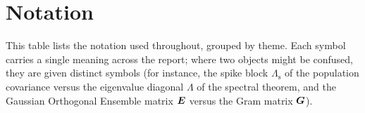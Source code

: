 
\section{Notation}\label{app:notation}

This table lists the notation used throughout, grouped by theme. Each symbol
carries a single meaning across the report; where two objects might be
confused, they are given distinct symbols (for instance, the spike block
\(\Lambda_{\mathrm{s}}\) of the population covariance versus the eigenvalue
diagonal \(\Lambda\) of the spectral theorem, and the Gaussian Orthogonal
Ensemble matrix \(\bm{E}\) versus the Gram matrix \(\bm{G}\)).

\renewcommand{\arraystretch}{1.3}

